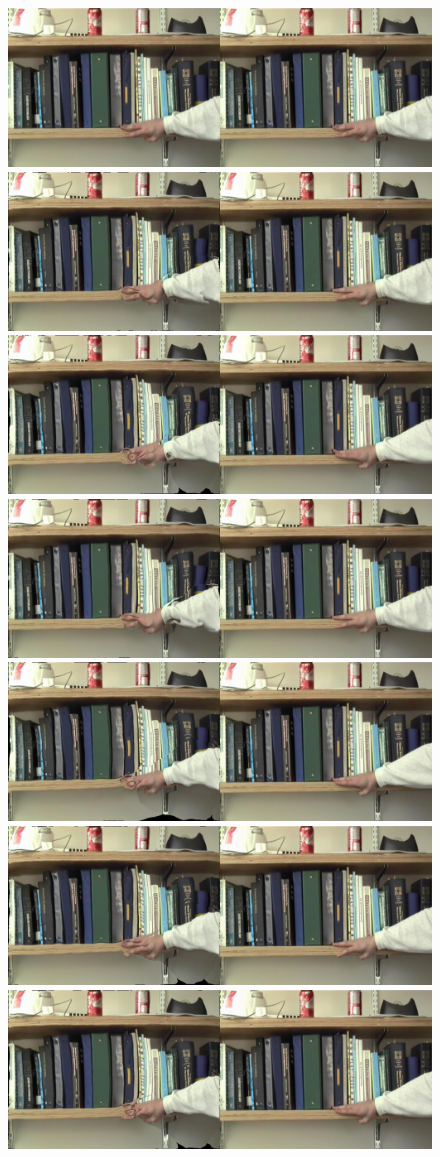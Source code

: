 \documentclass[12pt,twoside]{article}
\begin{document}
\begin{figure}[h]
  \begin{center}
    \includegraphics[width=0.45\linewidth, trim= 80pt 80pt 80pt 80pt, clip]{bookshelfMag/image1.jpg}
    \includegraphics[width=0.45\linewidth, trim= 80pt 80pt 80pt 80pt, clip]{bookshelfMag/image17.jpg} \\
    \includegraphics[width=0.45\linewidth, trim= 80pt 80pt 80pt 80pt, clip]{bookshelfMag/image3.jpg}
    \includegraphics[width=0.45\linewidth, trim= 80pt 80pt 80pt 80pt, clip]{bookshelfMag/image19.jpg} \\
    \includegraphics[width=0.45\linewidth, trim= 80pt 80pt 80pt 80pt, clip]{bookshelfMag/image5.jpg}
    \includegraphics[width=0.45\linewidth, trim= 80pt 80pt 80pt 80pt, clip]{bookshelfMag/image21.jpg} \\
    \includegraphics[width=0.45\linewidth, trim= 80pt 80pt 80pt 80pt, clip]{bookshelfMag/image7.jpg}

\end{center}
\end{figure}
\end{document}
